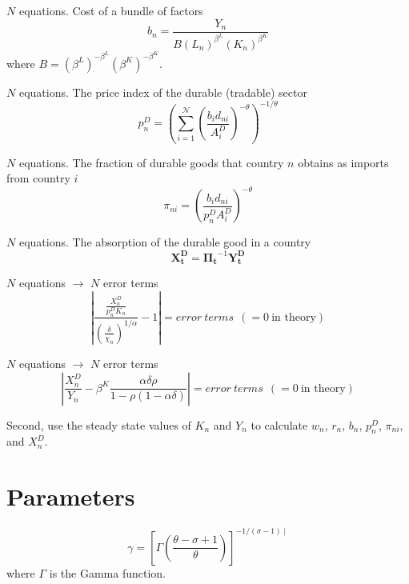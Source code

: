 \documentclass[11pt]{article}
\begin{document}
\noindent $N$ equations. Cost of a bundle of factors
\begin{equation}
b_{n}=\frac{Y_{n}}{B\left(L_{n}\right)^{\beta^{L}}\left(K_{n}\right)^{\beta^{K}}}
\end{equation}
where $B=\left(\beta^{L}\right)^{-\beta^{L}}\left(\beta^{K}\right)^{-\beta^{K}}$.

\noindent $N$ equations. The price index of the durable (tradable) sector
\begin{equation}
p_{n}^{D}=\left(\sum_{i=1}^{\mathcal{N}}\left(\frac{b_{i} d_{n i}}{A_{i}^{D}}\right)^{-\theta}\right)^{-1 / \theta}
\end{equation}

\noindent $N$ equations. The fraction of durable goods that country $n$ obtains as imports from country $i$
\begin{equation}
\pi_{n i}=\left(\frac{b_{i} d_{n i}}{p_{n}^{D} A_{i}^{D}}\right)^{-\theta}
\end{equation}

\noindent $N$ equations. The absorption of the durable good in a country 
\begin{equation}
\mathbf{X^D_t} = \mathbf{\Pi_t}^{-1} \mathbf{Y^D_t}
\end{equation}

\noindent $N$ equations $\rightarrow$ $N$ error terms
\begin{equation}
\left| \frac{\frac{X_{n}^{D}}{p_{n}^{D} K_{n}}}{\left(\frac{\delta}{\chi_{n}}\right)^{1 / \alpha}} - 1 \right| = error \ terms \ \ (= 0 \ \text{in theory})
\end{equation}

\noindent $N$ equations $\rightarrow$ $N$ error terms
\begin{equation}
\left| \frac{X_{n}^{D}}{Y_{n}} - \beta^{K} \frac{\alpha \delta \rho}{1-\rho(1-\alpha \delta)} \right| = error \ terms \ \ (= 0 \ \text{in theory})
\end{equation}

\noindent Second, use the steady state values of $K_n$ and $Y_n$ to calculate $w_n$, $r_n$, $b_n$, $p^D_n$, $\pi_{ni}$, and $X^D_n$.

\section{Parameters}
\begin{equation*}
	\gamma=\left[\Gamma\left(\frac{\theta-\sigma+1}{\theta}\right)\right]^{-1 /(\sigma-1) \mid}
\end{equation*}
where $\Gamma$ is the Gamma function.
\end{document}
